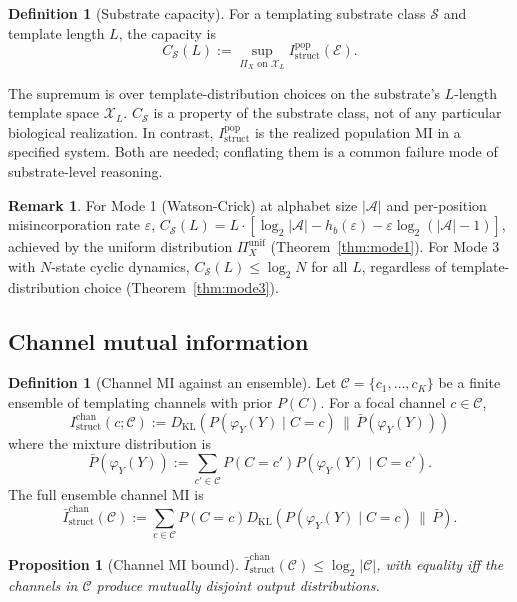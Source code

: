 \documentclass[11pt]{article}
\theoremstyle{plain}
\newtheorem{proposition}[theorem]{Proposition}
\theoremstyle{definition}
\newtheorem{definition}[theorem]{Definition}
\newtheorem{remark}[theorem]{Remark}
\newcommand{\Istructpop}{I_{\mathrm{struct}}^{\mathrm{pop}}}
\newcommand{\Istructchan}{I_{\mathrm{struct}}^{\mathrm{chan}}}
\newcommand{\Csub}{C_{\mathcal{S}}}
\newcommand{\Hbin}{h_b}
\newcommand{\descY}{\varphi_Y}
\newcommand{\KL}[2]{D_{\mathrm{KL}}\!\left(#1 \,\|\, #2\right)}
\begin{document}
\begin{definition}[Substrate capacity]
\label{def:capacity}
For a templating substrate class $\mathcal{S}$ and template length $L$, the capacity is
\[
\Csub(L) := \sup_{\Pi_X \text{ on } \mathcal{X}_L} \Istructpop(\mathcal{E}).
\]
\end{definition}

The supremum is over template-distribution choices on the substrate's $L$-length template space $\mathcal{X}_L$. $\Csub$ is a property of the substrate class, not of any particular biological realization. In contrast, $\Istructpop$ is the realized population MI in a specified system. Both are needed; conflating them is a common failure mode of substrate-level reasoning.

\begin{remark}
For Mode 1 (Watson-Crick) at alphabet size $|\mathcal{A}|$ and per-position misincorporation rate $\varepsilon$, $\Csub(L) = L \cdot \left[ \log_2 |\mathcal{A}| - \Hbin(\varepsilon) - \varepsilon \log_2 (|\mathcal{A}| - 1) \right]$, achieved by the uniform distribution $\Pi_X^{\mathrm{unif}}$ (Theorem~\ref{thm:mode1}). For Mode 3 with $N$-state cyclic dynamics, $\Csub(L) \le \log_2 N$ for all $L$, regardless of template-distribution choice (Theorem~\ref{thm:mode3}).
\end{remark}

\subsection{Channel mutual information}

\begin{definition}[Channel MI against an ensemble]
Let $\mathcal{C} = \{c_1, \ldots, c_K\}$ be a finite ensemble of templating channels with prior $P(C)$. For a focal channel $c \in \mathcal{C}$,
\[
\Istructchan(c; \mathcal{C}) := \KL{P(\descY(Y) \mid C = c)}{\bar{P}(\descY(Y))}
\]
where the mixture distribution is
\[
\bar{P}(\descY(Y)) := \sum_{c' \in \mathcal{C}} P(C = c') P(\descY(Y) \mid C = c').
\]
The full ensemble channel MI is
\[
\bar{I}_{\mathrm{struct}}^{\mathrm{chan}}(\mathcal{C}) := \sum_{c \in \mathcal{C}} P(C = c) \KL{P(\descY(Y) \mid C = c)}{\bar{P}}.
\]
\end{definition}

\begin{proposition}[Channel MI bound]
\label{prop:chan_bound}
$\bar{I}_{\mathrm{struct}}^{\mathrm{chan}}(\mathcal{C}) \le \log_2 |\mathcal{C}|$, with equality iff the channels in $\mathcal{C}$ produce mutually disjoint output distributions.
\end{proposition}
\end{document}
